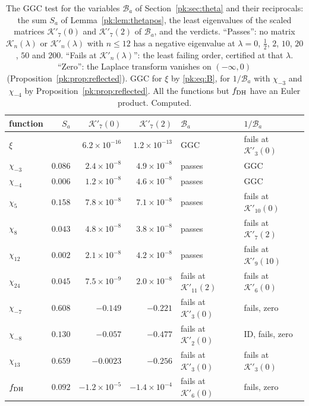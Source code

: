 \begin{table}[htbp]
\centering\footnotesize
\begin{tabular}{lrrrll}
\toprule
function & $S_a$ & $\mathcal K'_7(0)$ & $\mathcal K'_7(2)$ & $\mathcal B_a$ & $1/\mathcal B_a$\\
\midrule
$\xi$ & & $6.2\times10^{-16}$ & $1.2\times10^{-13}$ & GGC & fails at $\mathcal K'_3(0)$\\
$\chi_{-3}$ & $0.086$ & $2.4\times10^{-8}$ & $4.9\times10^{-8}$ & passes & GGC\\
$\chi_{-4}$ & $0.006$ & $1.2\times10^{-8}$ & $4.6\times10^{-8}$ & passes & GGC\\
$\chi_5$ & $0.158$ & $7.8\times10^{-8}$ & $7.1\times10^{-8}$ & passes & fails at $\mathcal K'_{10}(0)$\\
$\chi_8$ & $0.043$ & $4.8\times10^{-8}$ & $3.8\times10^{-8}$ & passes & fails at $\mathcal K'_7(2)$\\
$\chi_{12}$ & $0.002$ & $2.1\times10^{-8}$ & $4.2\times10^{-8}$ & passes & fails at $\mathcal K'_9(10)$\\
$\chi_{24}$ & $0.045$ & $7.5\times10^{-9}$ & $2.0\times10^{-8}$ & fails at $\mathcal K'_{11}(2)$ & fails at $\mathcal K'_6(0)$\\
$\chi_{-7}$ & $0.608$ & $-0.149$ & $-0.221$ & fails at $\mathcal K'_3(0)$ & fails, zero\\
$\chi_{-8}$ & $0.130$ & $-0.057$ & $-0.477$ & fails at $\mathcal K'_2(0)$ & ID, fails, zero\\
$\chi_{13}$ & $0.659$ & $-0.0023$ & $-0.256$ & fails at $\mathcal K'_3(0)$ & fails at $\mathcal K'_3(0)$\\
$f_{\rm DH}$ & $0.092$ & $-1.2\times10^{-5}$ & $-1.4\times10^{-4}$ & fails at $\mathcal K'_6(0)$ & fails, zero\\
\bottomrule
\end{tabular}
\caption{The GGC test for the variables $\mathcal B_a$ of Section~\ref{pk:sec:theta} and their reciprocals: the sum $S_a$ of Lemma~\ref{pk:lem:thetapos}, the least eigenvalues of the scaled matrices $\mathcal K'_7(0)$ and $\mathcal K'_7(2)$ of $\mathcal B_a$, and the verdicts. ``Passes'': no matrix $\mathcal K_n(\lambda)$ or $\mathcal K'_n(\lambda)$ with $n\le12$ has a negative eigenvalue at $\lambda=0$, $\frac12$, $2$, $10$, $20$, $50$ and $200$. ``Fails at $\mathcal K'_n(\lambda)$'': the least failing order, certified at that $\lambda$. ``Zero'': the Laplace transform vanishes on $(-\infty,0)$ (Proposition~\ref{pk:prop:reflected}). GGC for $\xi$ by \eqref{pk:eq:B}, for $1/\mathcal B_a$ with $\chi_{-3}$ and $\chi_{-4}$ by Proposition~\ref{pk:prop:reflected}. All the functions but $f_{\rm DH}$ have an Euler product. Computed.}
\label{pk:tab:chars}
\end{table}


